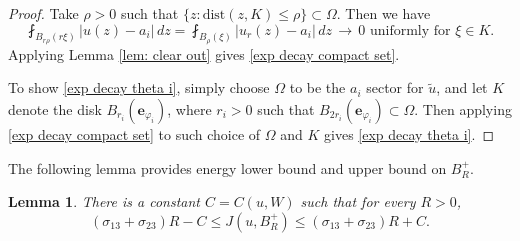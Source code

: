\documentclass[leqno,11pt]{amsart}
\let\Om=\Omega
\newtheorem{lemma}[theorem]{Lemma}
\theoremstyle{remark}
\newcommand{\dist}{\mathrm{dist}}
\newcommand{\tu}{\tilde{u}}
\begin{document}
\begin{proof}
 Take $\rho>0$ such that $\{z: \dist(z,K)\leq \rho\}\subset \Om$. Then we have 
 \[
 \fint_{B_{r\rho} (r\xi)}|u(z)-a_i|\,dz=\fint_{B_\rho(\xi)}|u_r(z)-a_i|\,dz\, \to\, 0 \text{ uniformly for }\xi\in K.
 \]
Applying Lemma \ref{lem: clear out} gives \eqref{exp decay compact set}. 

To show \eqref{exp decay theta i}, simply choose $\Omega$ to be the $a_i$ sector for $\tu$, and let $K$ denote the disk $B_{r_i}(\mathbf{e}_{\varphi_i})$, where $r_i>0$ such that $B_{2r_i}(\mathbf{e}_{\varphi_i})\subset \Omega$. Then applying \eqref{exp decay compact set} to such choice of $\Om$ and $K$ gives \eqref{exp decay theta i}.

\end{proof}

The following lemma provides energy lower bound and upper bound on $B_R^+$.

\begin{lemma}\label{lem:sharp ene bd}
    There is a constant $C=C(u,W)$ such that for every $R>0$, 
    \begin{equation}\label{ineq:sharp bd}
        (\sigma_{13}+\sigma_{23}) R-C\leq J(u,B_R^+)\leq (\sigma_{13}+\sigma_{23}) R+C.
    \end{equation}
\end{lemma}
\end{document}
